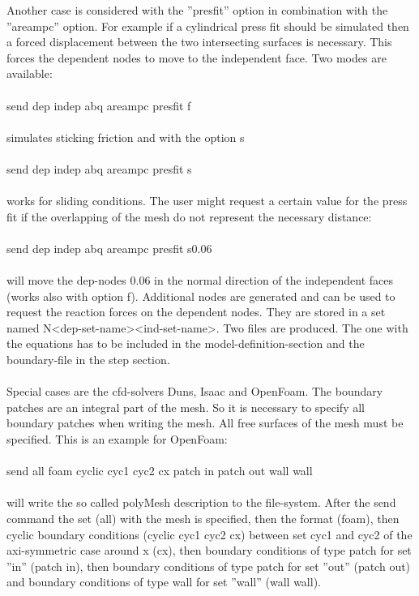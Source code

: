 \documentclass{article}
\begin{document}
Another case is considered with the ''presfit'' option in combination with the ''areampc'' option. For example if a cylindrical press fit should be simulated then a forced displacement between the two intersecting surfaces is necessary. This forces the dependent nodes to move to the independent face. Two modes are available:\\\\send dep indep abq areampc presfit f\\\\simulates sticking friction and with the option s\\\\send dep indep abq areampc presfit s\\\\works for sliding conditions. The user might request a certain value for the press fit if the overlapping of the mesh do not represent the necessary distance:\\\\send dep indep abq areampc presfit s0.06\\\\will move the dep-nodes 0.06 in the normal direction of the independent faces (works also with option f). Additional nodes are generated and can be used to request the reaction forces on the dependent nodes. They are stored in a set named N<dep-set-name><ind-set-name>. Two files are produced. The one with the equations has to be included in the model-definition-section and the boundary-file in the step section.\\\\
Special cases are the cfd-solvers Duns, Isaac and OpenFoam. The boundary patches are an integral part of the mesh. So it is necessary to specify all boundary patches when writing the mesh. All free surfaces of the mesh must be specified. This is an example for OpenFoam:\\\\send all foam cyclic cyc1 cyc2 cx patch in patch out wall wall\\\\will write the so called polyMesh description to the file-system. After the send command the set (all) with the mesh is specified, then the format (foam), then cyclic boundary conditions (cyclic cyc1 cyc2 cx) between set cyc1 and cyc2 of the axi-symmetric case around x (cx), then boundary conditions of type patch for set ''in'' (patch in), then boundary conditions of type patch for set ''out'' (patch out) and boundary conditions of type wall for set ''wall'' (wall wall).
\end{document}
